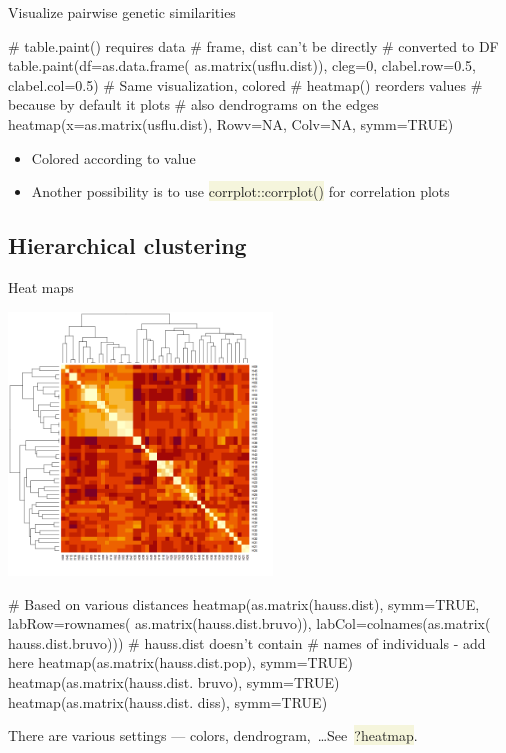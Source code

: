 \documentclass[compress, ucs, xelatex, 11pt, xcolor=svgnames, aspectratio=169,
	hyperref={
		bookmarks=true,
		unicode=true,
		colorlinks=true,
		pdftitle={Molecular data in R},
		plainpages=false,
		pdfauthor={Vojtech Zeisek},
		pdfsubject={Course about phylogeny and evolution in R},
		pdfcreator={XeLaTeX},
		pdfkeywords={R, evolution, phylogeny, molecular data},
		linkcolor=Crimson, %
		anchorcolor=Magenta, %
		citecolor=Magenta, %
		filecolor=Magenta, %
		menucolor=Magenta, %
		urlcolor=DodgerBlue, %
		pdftex},
	url={hyphens, lowtilde} %
	]{beamer}
\renewcommand{\texttt}[1]{\colorbox{Beige}{{\ttfamily #1}}}
\begin{document}
\begin{frame}[fragile]{Visualize pairwise genetic similarities}
	\begin{multicols}{2}
		\vfil
		\begin{spluscode}
    # table.paint() requires data
    # frame, dist can't be directly
    # converted to DF
    table.paint(df=as.data.frame(
      as.matrix(usflu.dist)), cleg=0,
      clabel.row=0.5, clabel.col=0.5)
    # Same visualization, colored
    # heatmap() reorders values
    # because by default it plots
    # also dendrograms on the edges
    heatmap(x=as.matrix(usflu.dist),
      Rowv=NA, Colv=NA, symm=TRUE)
		\end{spluscode}
		\vfill
		\begin{itemize}
			\item Colored according to value
			\item Another possibility is to use \texttt{corrplot::corrplot()} for correlation plots
		\end{itemize}
		\columnbreak
		\begin{center}
			\texttt{[image: dna-dists.png]}
		\end{center}
	\end{multicols}
\end{frame}

\subsection{Hierarchical clustering}

\begin{frame}[fragile]{Heat maps}
	\label{hierclust}
	\begin{multicols}{2}
		\includegraphics[height=7cm]{heatmap.png}
		\columnbreak
		\begin{spluscode}
    # Based on various distances
    heatmap(as.matrix(hauss.dist),
      symm=TRUE, labRow=rownames(
      as.matrix(hauss.dist.bruvo)),
      labCol=colnames(as.matrix(
      hauss.dist.bruvo)))
      # hauss.dist doesn't contain
      # names of individuals - add here
    heatmap(as.matrix(hauss.dist.pop),
      symm=TRUE)
    heatmap(as.matrix(hauss.dist.
      bruvo), symm=TRUE)
    heatmap(as.matrix(hauss.dist.
      diss), symm=TRUE)
		\end{spluscode}
		\begin{footnotesize}
			There are various settings --- colors, dendrogram,~\ldots See~\texttt{?heatmap}.
		\end{footnotesize}
	\end{multicols}
\end{frame}
\end{document}

